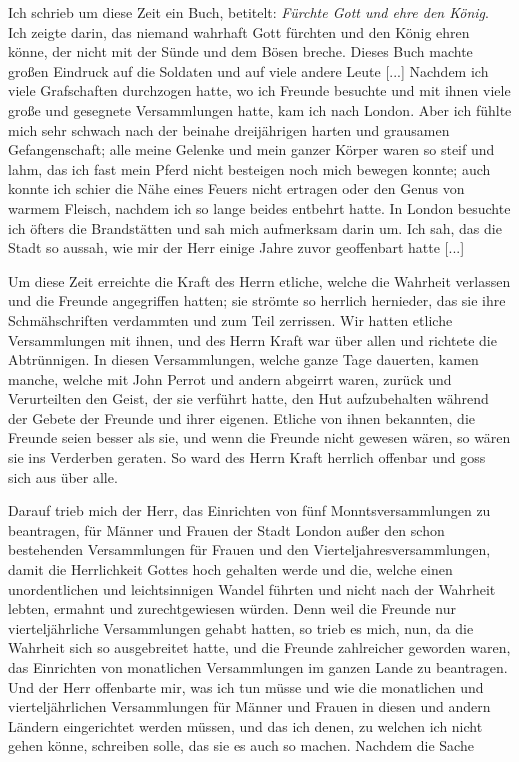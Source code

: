 Ich schrieb um diese Zeit ein Buch, betitelt: \textit{Fürchte Gott
und ehre den König}. Ich zeigte darin, das niemand wahrhaft
Gott fürchten und den König ehren könne, der nicht mit der Sünde
und dem Bösen breche. Dieses Buch machte großen Eindruck
auf die Soldaten und auf viele andere Leute [...]
Nachdem ich viele Grafschaften durchzogen hatte, wo ich
Freunde besuchte und mit ihnen viele große und gesegnete 
Versammlungen hatte, kam ich nach London. Aber ich fühlte mich
sehr schwach nach der beinahe dreijährigen harten und grausamen
Gefangenschaft; alle meine Gelenke und mein ganzer Körper waren
so steif und lahm, das ich fast mein Pferd nicht besteigen noch
mich bewegen konnte; auch konnte ich schier die Nähe eines Feuers
nicht ertragen oder den Genus von warmem Fleisch, nachdem ich
so lange beides entbehrt hatte. In London besuchte ich öfters
die Brandstätten und sah mich aufmerksam darin um. Ich sah,
das die Stadt so aussah, wie mir der Herr einige Jahre zuvor
geoffenbart hatte [...]

Um diese Zeit erreichte die Kraft des Herrn etliche, welche
die Wahrheit verlassen und die Freunde angegriffen hatten; sie
strömte so herrlich hernieder, das sie ihre Schmähschriften verdammten 
und zum Teil zerrissen. Wir hatten etliche Versammlungen 
mit ihnen, und des Herrn Kraft war über allen und richtete
die Abtrünnigen. In diesen Versammlungen, welche ganze Tage
dauerten, kamen manche, welche 
mit John Perrot und andern
abgeirrt waren, zurück und Verurteilten den Geist, der sie verführt
hatte, den Hut aufzubehalten während der Gebete der Freunde
und ihrer eigenen. Etliche von ihnen bekannten, die Freunde
seien besser als sie, und wenn die Freunde nicht gewesen wären,
so wären sie ins Verderben geraten. So ward des Herrn Kraft
herrlich offenbar und goss sich aus über alle.

Darauf trieb mich der Herr, das Einrichten von fünf 
Monntsversammlungen zu beantragen, 
für Männer und Frauen der
Stadt London außer den schon bestehenden Versammlungen für
Frauen und den Vierteljahresversammlungen, 
damit die Herrlichkeit Gottes hoch gehalten werde und die, welche einen 
unordentlichen und leichtsinnigen Wandel führten und nicht nach der 
Wahrheit lebten, ermahnt und zurechtgewiesen würden. Denn weil
die Freunde nur vierteljährliche Versammlungen gehabt hatten, so
trieb es mich, nun, da die Wahrheit sich so ausgebreitet hatte,
und die Freunde zahlreicher geworden waren, das Einrichten von
monatlichen Versammlungen im ganzen Lande zu beantragen.
Und der Herr offenbarte mir, was ich tun müsse und wie die
monatlichen und vierteljährlichen Versammlungen für Männer
und Frauen in diesen und andern Ländern eingerichtet werden
müssen, und das ich denen, zu welchen ich nicht gehen könne,
schreiben solle, das sie es auch so machen. Nachdem die Sache

